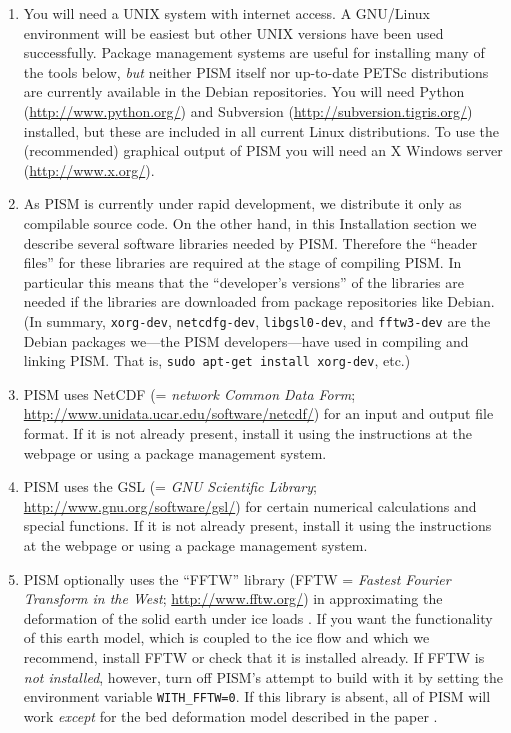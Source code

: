 \documentclass[11pt,final]{amsart}
\begin{document}
\begin{enumerate}
\item You will need a UNIX system with internet access.  A GNU/Linux environment will be easiest but other UNIX versions have been used successfully.  Package management systems are useful for installing many of the tools below, \emph{but} neither PISM itself nor up-to-date PETSc distributions are currently available in the Debian repositories.  You will need Python (\url{http://www.python.org/}) and Subversion (\url{http://subversion.tigris.org/}) installed, but these are included in all current Linux distributions.  To use the (recommended) graphical output of PISM you will need an X Windows server (\url{http://www.x.org/}).

\item As PISM is currently under rapid development, we distribute it only as compilable source code.  On the other hand, in this Installation section we describe several software libraries needed by PISM.  Therefore the ``header files'' for these libraries are required at the stage of compiling PISM.  In particular this means that the ``developer's versions'' of the libraries are needed if the libraries are downloaded from package repositories like Debian.  (In summary, \verb|xorg-dev|, \verb|netcdfg-dev|, \verb|libgsl0-dev|, and \verb|fftw3-dev| are the Debian packages we---the PISM developers---have used in compiling and linking PISM.  That is, \verb|sudo apt-get install xorg-dev|, etc.)

\item PISM uses NetCDF (= \emph{network Common Data Form}; \url{http://www.unidata.ucar.edu/software/netcdf/}) for an input and output file format.   If it is not already present, install it using the instructions at the webpage or using a package management system.

\item PISM uses the GSL (= \emph{GNU Scientific Library}; \url{http://www.gnu.org/software/gsl/}) for certain numerical calculations and special functions.  If it is not already present, install it using the instructions at the webpage or using a package management system.

\item PISM optionally uses the ``FFTW'' library (FFTW = \emph{Fastest Fourier Transform in the West}; \url{http://www.fftw.org/}) in approximating the deformation of the solid earth under ice loads \cite{BLKfastearth}.  If you want the functionality of this earth model, which is coupled to the ice flow and which we recommend, install FFTW or check that it is installed already.  If FFTW is \emph{not installed}, however, turn off PISM's attempt to build with it by setting the environment variable \verb|WITH_FFTW=0|.   If this library is absent, all of PISM will work \emph{except} for the bed deformation model described in the paper \cite{BLKfastearth}.


\end{enumerate}
\end{document}
